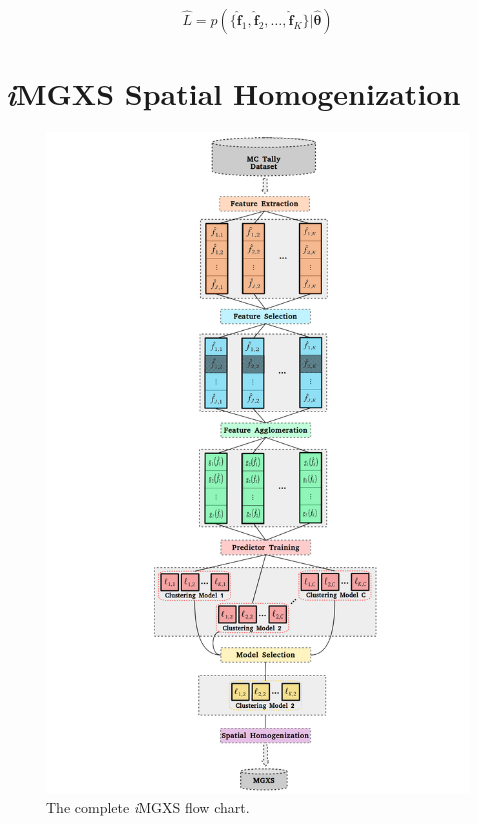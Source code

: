 \begin{equation}
\label{eqn:chap10-likelihood}
\hat{L} = p \left( \lbrace \boldsymbol{\hat{f}}_{1}, \boldsymbol{\hat{f}}_{2}, \dots, \boldsymbol{\hat{f}}_{K} \rbrace | \boldsymbol{\hat{\theta}}\right)
\end{equation}


\section{\textit{i}\ac{MGXS} Spatial Homogenization}
\label{sec:chap10-imgxs-pipeline}

\begin{figure}[h!]
\centering
\includegraphics[width=0.95\linewidth]{figures/unsupervised/features/engineering/flow-chart}
\vspace{2mm}
\caption[\textit{i}MGXS flow chart]{The complete \textit{i}\ac{MGXS} flow chart.}
\label{fig:chap10-flow-chart}
\end{figure}


